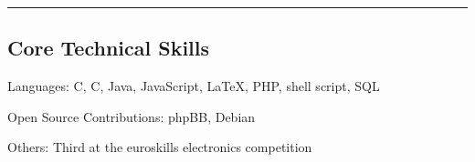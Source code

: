 \documentclass[10pt,letterpaper]{article}
\newenvironment{indentsection}[1]%
{\begin{list}{}%
	{\setlength{\leftmargin}{#1}}%
	\item[]%
}
{\end{list}}
\newcommand{\CPP}
{C\nolinebreak[4]\hspace{-.05em}\raisebox{.22ex}{\footnotesize\bf ++}}
\begin{document}
\hrule
\vspace{-0.4em}
\subsection*{Core Technical Skills}

\begin{indentsection}{\parindent}
\begin{description*}
	\item[Languages:]
	C, \CPP, Java, JavaScript, \LaTeX, PHP, shell script, SQL
	\item[Open Source Contributions:]
	phpBB, Debian
        \item[Others:] Third at the euroskills electronics competition
\end{description*}
\end{indentsection}
\end{document}
